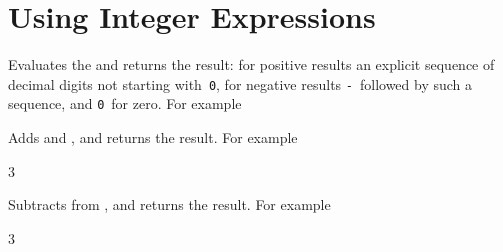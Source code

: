 \documentclass[oneside]{book}
\let\tn=\cs
\begin{document}

\section{Using Integer Expressions}

\begin{function}{\intEval}
\begin{syntax}
 
\end{syntax}
Evaluates the  and returns the result:
for positive results an
explicit sequence of decimal digits not starting with~\texttt{0},
for negative results \texttt{-}~followed by such a sequence, and
\texttt{0}~for zero. For example
\begin{demohigh}
\end{demohigh}
\begin{demohigh}
\end{demohigh}
\end{function}

\begin{function}{\intMathAdd}
\begin{syntax}
  
\end{syntax}
Adds  and ,
and returns the result. For example
\begin{demohigh}
 {3}
\end{demohigh}
\end{function}

\begin{function}{\intMathSub}
\begin{syntax}
  
\end{syntax}
Subtracts  from ,
and returns the result. For example
\begin{demohigh}
 {3}
\end{demohigh}
\end{function}
\end{document}
